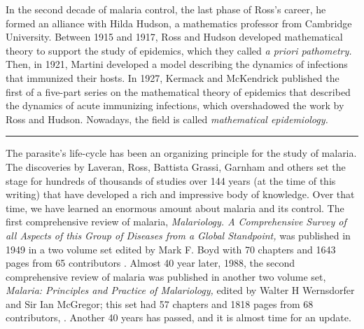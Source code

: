 \documentclass[
]{book}
\begin{document}
In the second decade of malaria control, the last phase of Ross's career, he formed an alliance with Hilda Hudson, a mathematics professor from Cambridge University. Between 1915 and 1917, Ross and Hudson developed mathematical theory to support the study of epidemics, which they called \emph{a priori pathometry.} Then, in 1921, Martini developed a model describing the dynamics of infections that immunized their hosts. In 1927, Kermack and McKendrick published the first of a five-part series on the mathematical theory of epidemics that described the dynamics of acute immunizing infections, which overshadowed the work by Ross and Hudson. Nowadays, the field is called \emph{mathematical epidemiology.}

\begin{center}\rule{0.5\linewidth}{0.5pt}\end{center}

The parasite's life-cycle has been an organizing principle for the study of malaria.
The discoveries by Laveran, Ross, Battista Grassi, Garnham and others set the stage for hundreds of thousands of studies over 144 years (at the time of this writing) that have developed a rich and impressive body of knowledge.
Over that time, we have learned an enormous amount about malaria and its control.
The first comprehensive review of malaria, \emph{Malariology. A Comprehensive Survey of all Aspects of this Group of Diseases from a Global Standpoint,} was published in 1949 in a two volume set edited by Mark F. Boyd with
70 chapters and 1643 pages from 65 contributors \autocite{BoydMF1949MalariologyComprehensive}.
Almost 40 year later, 1988, the second comprehensive review of malaria was published in another two volume set, \emph{Malaria: Principles and Practice of Malariology,}
edited by Walter H Wernsdorfer and Sir Ian McGregor; this set had 57 chapters and 1818 pages from 68 contributors, \autocite{WernsdorferWH1988MalariaPrinciples}.
Another 40 years has passed, and it is almost time for an update.
\end{document}
